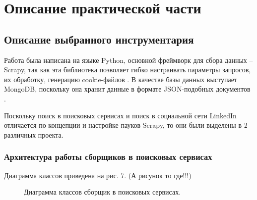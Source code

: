 \section{Описание практической части}
\label{sec:Chapter4} 
\subsection{Описание выбранного инструментария}
Работа была написана на языке Python, основной фреймворк для сбора данных -- Scrapy, так как эта библиотека позволяет
гибко настраивать параметры запросов, их обработку, генерацию cookie-файлов \cite{scrapyBook}. В качестве базы данных
выступает MongoDB, поскольку она хранит данные в формате JSON-подобных документов \cite{mongoDBBook}. 

\par
Поскольку поиск в поисковых сервисах и поиск в социальной сети LinkedIn отличается по концепции и настройке пауков Scrapy, то
они были выделены в 2 различных проекта.

\subsubsection{Архитектура работы сборщиков в поисковых сервисах}
\par
Диаграмма классов приведена на рис. 7. (А рисунок то где!!!)

\begin{figure}[H]
    \caption{Диаграмма классов сборщик в поисковых сервисах.}
    \label{ris:image}
\end{figure}

